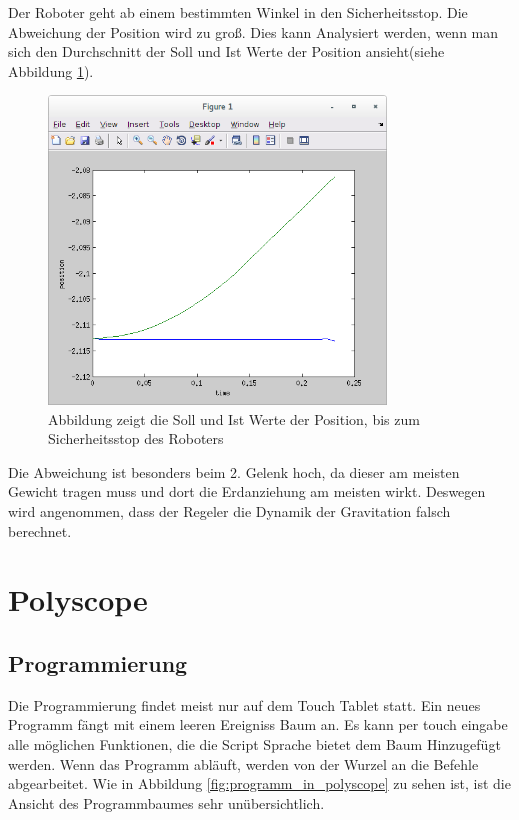 Der Roboter geht ab einem bestimmten Winkel in den Sicherheitsstop. Die Abweichung der Position wird zu groß. Dies kann Analysiert werden, wenn man sich den Durchschnitt der Soll und Ist Werte der Position ansieht(siehe Abbildung \ref{fig:position_join1}).
\\
\begin{figure}[H]
  \centering
    \includegraphics[width=0.8\textwidth]{pic/joint1_position_capi.png}
      \caption[Soll und Ist Werte der Position]{Abbildung zeigt die Soll und Ist Werte der Position, bis zum Sicherheitsstop des Roboters}
      \label{fig:position_join1}
\end{figure}

Die Abweichung ist besonders beim 2. Gelenk hoch, da dieser am meisten Gewicht tragen muss und dort die Erdanziehung am meisten wirkt. Deswegen wird angenommen, dass der Regeler die Dynamik der Gravitation falsch berechnet.

\section{Polyscope}
\label{sec:Polyscope_rel}

\subsection{Programmierung}
\label{sub:programmierung_polyscope_rel}

Die Programmierung findet meist nur auf dem Touch Tablet statt. Ein neues Programm fängt mit einem leeren Ereigniss Baum an. Es kann per touch eingabe alle möglichen Funktionen, die die Script Sprache bietet dem Baum Hinzugefügt werden. Wenn das Programm abläuft, werden von der Wurzel an die Befehle abgearbeitet.
Wie in Abbildung \ref{fig:programm_in_polyscope} zu sehen ist, ist die Ansicht des Programmbaumes sehr unübersichtlich.

